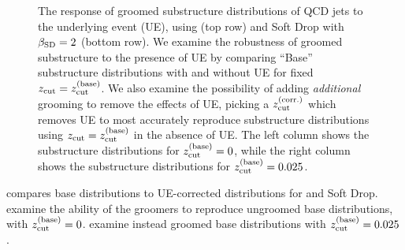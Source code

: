 \begin{figure}[p]
{\label{fig:sd_ue_025}
    }
\caption{
The response of groomed substructure distributions of QCD jets to the underlying event (UE), using  (top row) and Soft Drop with \(\beta_{\rm SD} = 2\) (bottom row).
%
We examine the robustness of groomed substructure to the presence of UE by comparing ``Base'' substructure distributions with and without UE for fixed \(z_{\rm cut} = z^{(\rm base)}_{\rm cut}\).
%
We also examine the possibility of adding \textit{additional} grooming to remove the effects of UE, picking a \(z^{(\rm corr.)}_{\rm cut}\) which removes UE to most accurately reproduce substructure distributions using \(z_{\rm cut} = z^{(\rm base)}_{\rm cut}\) in the absence of UE.
%
The left column shows the substructure distributions for \(z^{(\rm base)}_{\rm cut} = 0\), while the right column shows the substructure distributions for \(z^{(\rm base)}_{\rm cut} = 0.025\).
}
\label{fig:ue}
\end{figure}


 compares base distributions to UE-corrected distributions for  and Soft Drop.
%
 examine the ability of the groomers to reproduce ungroomed base distributions, with \(z_{\rm cut}^{(\rm base)} = 0\).
%
 examine instead groomed base distributions with \(z_{\rm cut}^{(\rm base)} = 0.025\).

